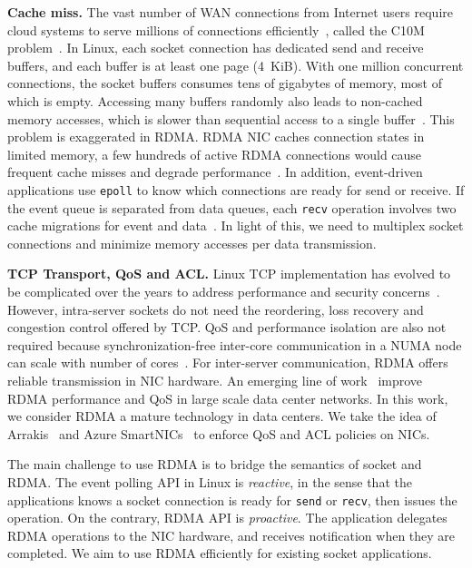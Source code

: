 \textbf{Cache miss.}
The vast number of WAN connections from Internet users require cloud systems to serve millions of connections efficiently~\cite{nishtala2013scaling,lin2016scalable,belay2017ix}, called the C10M problem~\cite{graham2013c10m}. In Linux, each socket connection has dedicated send and receive buffers, and each buffer is at least one page (4~KiB). With one million concurrent connections, the socket buffers consumes tens of gigabytes of memory, most of which is empty. Accessing many buffers randomly also leads to non-cached memory accesses, which is slower than sequential access to a single buffer~\cite{li2017kv}. This problem is exaggerated in RDMA. RDMA NIC caches connection states in limited memory, a few hundreds of active RDMA connections would cause frequent cache misses and degrade performance~\cite{mprdma,kaminsky2016design}. In addition, event-driven applications use \texttt{epoll} to know which connections are ready for send or receive. If the event queue is separated from data queues, each \texttt{recv} operation involves two cache migrations for event and data~\cite{yasukata2016stackmap}. In light of this, we need to multiplex socket connections and minimize memory accesses per data transmission.


\textbf{TCP Transport, QoS and ACL.}
Linux TCP implementation has evolved to be complicated over the years to address performance and security concerns~\cite{yasukata2016stackmap}. However, intra-server sockets do not need the reordering, loss recovery and congestion control offered by TCP. QoS and performance isolation are also not required because synchronization-free inter-core communication in a NUMA node can scale with number of cores~\cite{intel-manual}. For inter-server communication, RDMA offers reliable transmission in NIC hardware. An emerging line of work~\cite{zhu2015congestion,guo2016rdma,lu2017memory,mprdma} improve RDMA performance and QoS in large scale data center networks. In this work, we consider RDMA a mature technology in data centers. We take the idea of Arrakis~\cite{peter2016arrakis} and Azure SmartNICs~\cite{smartnic} to enforce QoS and ACL policies on NICs.

The main challenge to use RDMA is to bridge the semantics of socket and RDMA. The event polling API in Linux is \textit{reactive}, in the sense that the applications knows a socket connection is ready for \texttt{send} or \texttt{recv}, then issues the operation.
On the contrary, RDMA API is \textit{proactive}. The application delegates RDMA operations to the NIC hardware, and receives notification when they are completed.
We aim to use RDMA efficiently for existing socket applications.
